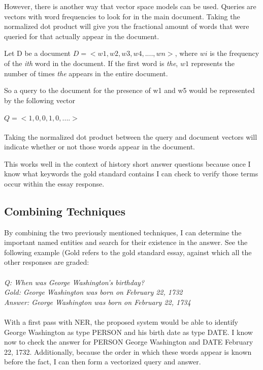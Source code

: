 However, there is another way that vector space models can be used. Queries are vectors with word frequencies to look for in the main document. Taking the normalized dot product will give you the fractional amount of words that were queried for that actually appear in the document.

Let D be a document $D = <w1, w2, w3, w4, ...., wn>$, where $wi$ is the frequency of the \textit{ith} word in the document. If the first word is \textit{the}, $w1$ represents the number of times \textit{the} appears in the entire document.

So a query to the document for the presence of w1 and w5 would be represented by the following vector 
\\\\
$Q=<1, 0, 0, 1, 0, ....>$
\\\\
Taking the normalized dot product between the query and document vectors will indicate whether or not those words appear in the document.

This works well in the context of history short answer questions because once I know what keywords the gold standard contains I can check to verify those terms occur within the essay response.

\subsection{Combining Techniques}
By combining the two previously mentioned techniques, I can determine the important named entities and search for their existence in the answer. See the following example (Gold refers to the gold standard essay, against which all the other responses are graded:
\\\\
\textit{Q: When was George Washington's birthday?}\\
\textit{Gold: George Washington was born on February 22, 1732}\\
\textit{Answer: George Washington was born on February 22, 1734}
\\\\
With a first pass with NER, the proposed system would be able to identify George Washington as type PERSON and his birth date as type DATE. I know now to check the answer for PERSON George Washington and DATE February 22, 1732. Additionally, because the order in which these words appear is known before the fact, I can then form a vectorized query and answer.

